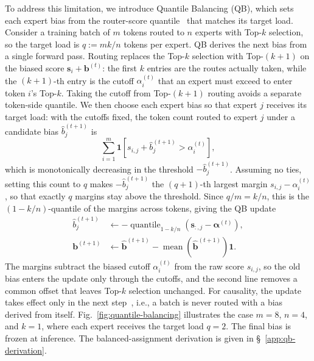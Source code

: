 To address this limitation, we introduce Quantile Balancing (QB), which sets each expert bias from the router-score quantile~\citep{su2026qb,sun2026expertthreshold} that matches its target load.
Consider a training batch of $m$ tokens routed to $n$ experts with Top-$k$ selection, so the target load is $q:=mk/n$ tokens per expert.
QB derives the next bias from a single forward pass.
Routing replaces the Top-$k$ selection with Top-$(k{+}1)$ on the biased score $\bm{s}_i+\bm{b}^{(t)}$: the first $k$ entries are the routes actually taken, while the $(k{+}1)$-th entry is the cutoff $\alpha_i^{(t)}$ that an expert must exceed to enter token $i$'s Top-$k$.
Taking the cutoff from Top-$(k{+}1)$ routing avoids a separate token-side quantile.
We then choose each expert bias so that expert $j$ receives its target load: with the cutoffs fixed, the token count routed to expert $j$ under a candidate bias $\widehat{b}_j^{(t+1)}$ is
\begin{equation*}
    \sum_{i=1}^{m}\mathbf{1}\!\left[s_{i,j}+\widehat{b}_j^{(t+1)}>\alpha_i^{(t)}\right],
\end{equation*}
which is monotonically decreasing in the threshold $-\widehat{b}_j^{(t+1)}$.
Assuming no ties, setting this count to $q$ makes $-\widehat{b}_j^{(t+1)}$ the $(q{+}1)$-th largest margin $s_{i,j}-\alpha_i^{(t)}$, so that exactly $q$ margins stay above the threshold.
Since $q/m=k/n$, this is the $(1-k/n)$-quantile of the margins across tokens, giving the QB update
\begin{align}
    \widehat{b}_j^{(t+1)}
     & \leftarrow -\operatorname{quantile}_{1-k/n}\!\left(\bm{s}_{:,j}-\bm{\alpha}^{(t)}\right), \nonumber \\
    \bm{b}^{(t+1)}
     & \leftarrow \widehat{\bm{b}}^{(t+1)}
    - \operatorname{mean}\!\left(\widehat{\bm{b}}^{(t+1)}\right)\mathbf{1}.
    \label{eq:qb-update}
\end{align}
The margins subtract the biased cutoff $\alpha_i^{(t)}$ from the raw score $s_{i,j}$, so the old bias enters the update only through the cutoffs, and the second line removes a common offset that leaves Top-$k$ selection unchanged.
For causality, the update takes effect only in the next step~\citep{deepseekaiv3}, i.e., a batch is never routed with a bias derived from itself.
Fig.~\ref{fig:quantile-balancing} illustrates the case $m=8$, $n=4$, and $k=1$, where each expert receives the target load $q=2$.
The final bias is frozen at inference.
The balanced-assignment derivation is given in \S~\ref{app:qb-derivation}.

